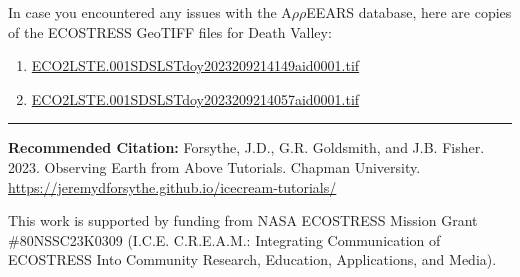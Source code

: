 \documentclass[oneside,a4paper,11pt,explicit]{book}
\begin{document}
\begin{tcolorbox}[colback=yellow!5!white,title=\textbf{Datafiles}]
	\large
	In case you encountered any issues with the A$\rho\rho$EEARS database, here are copies of the ECOSTRESS GeoTIFF files for Death Valley:
	\begin{enumerate}
		\item \href{https://jeremydforsythe.github.io/icecream-tutorials/Tutorial3_AccessingRemoteSensingDataWithAppears/ECO2LSTE.001_SDS_LST_doy2023209214149_aid0001.tif}{\small ECO2LSTE.001\textunderscore SDS\textunderscore LST\textunderscore doy2023209214149\textunderscore aid0001.tif}
		\item \href{https://jeremydforsythe.github.io/icecream-tutorials/Tutorial3_AccessingRemoteSensingDataWithAppears/ECO2LSTE.001_SDS_LST_doy2023209214057_aid0001.tif}{\small ECO2LSTE.001\textunderscore SDS\textunderscore LST\textunderscore doy2023209214057\textunderscore aid0001.tif}
	\end{enumerate}
\end{tcolorbox}


\hrule

\vspace{1em}

\small \textbf{Recommended Citation:} Forsythe, J.D., G.R. Goldsmith, and J.B. Fisher. 2023. Observing Earth from Above Tutorials. Chapman University. \url{https://jeremydforsythe.github.io/icecream-tutorials/}

\vspace{1em}

This work is supported by funding from NASA ECOSTRESS Mission Grant \#80NSSC23K0309 (I.C.E. C.R.E.A.M.: Integrating Communication of ECOSTRESS Into Community Research, Education, Applications, and Media).
\end{document}
